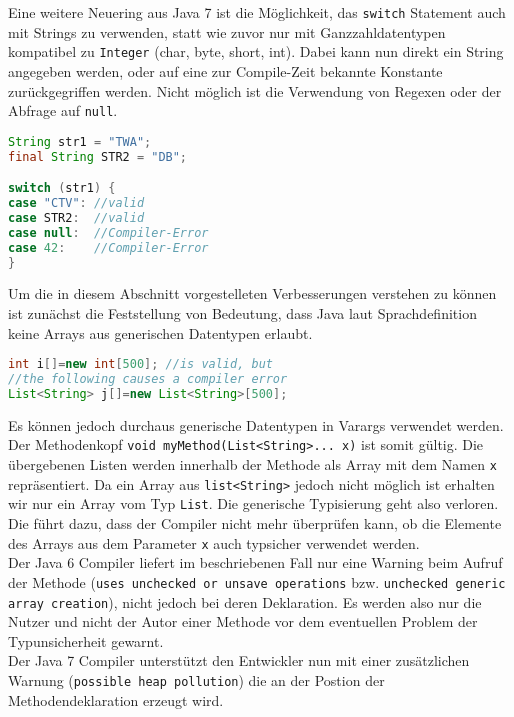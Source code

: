 \documentclass[times, 10pt,twocolumn]{article}
\begin{document}
Eine weitere Neuering aus Java 7 ist die Möglichkeit, das \texttt{switch} Statement auch mit Strings zu verwenden, statt wie
zuvor nur mit Ganzzahldatentypen kompatibel zu \texttt{Integer} (char, byte, short, int). Dabei kann nun direkt ein String
angegeben werden, oder auf eine zur Compile-Zeit bekannte Konstante zurückgegriffen werden. Nicht möglich ist die Verwendung
von Regexen oder der Abfrage auf \texttt{null}.\cite{javainsel2}

\begin{lstlisting}[language=java,breaklines=true]
String str1 = "TWA";
final String STR2 = "DB";

switch (str1) {
case "CTV": //valid
case STR2:  //valid
case null:  //Compiler-Error
case 42:	//Compiler-Error
}
\end{lstlisting}

Um die in diesem Abschnitt vorgestelleten Verbesserungen verstehen zu können ist zunächst die Feststellung von Bedeutung, dass Java laut Sprachdefinition keine Arrays aus generischen Datentypen erlaubt.
\begin{lstlisting}[language=java,breaklines=true]
int i[]=new int[500]; //is valid, but
//the following causes a compiler error
List<String> j[]=new List<String>[500];
\end{lstlisting}
Es können jedoch durchaus generische Datentypen in Varargs verwendet werden. Der Methodenkopf \texttt{void myMethod(List<String>... x)} ist somit gültig. Die übergebenen Listen werden innerhalb der Methode als Array mit dem Namen \texttt{x} repräsentiert. Da ein Array aus \texttt{list<String>} jedoch nicht möglich ist erhalten wir nur ein Array vom Typ \texttt{List}. Die generische Typisierung geht also verloren.\\

Die führt dazu, dass der Compiler nicht mehr überprüfen kann, ob die Elemente des Arrays aus dem Parameter \texttt{x} auch typsicher verwendet werden.\cite{v2bJava7}\\

Der Java 6 Compiler liefert im beschriebenen Fall nur eine Warning beim Aufruf der Methode (\texttt{uses unchecked or unsave operations} bzw. \texttt{unchecked generic array creation}), nicht jedoch bei deren Deklaration. Es werden also nur die Nutzer und nicht der Autor einer Methode vor dem eventuellen Problem der Typunsicherheit gewarnt.\\

Der Java 7 Compiler unterstützt den Entwickler nun mit einer zusätzlichen Warnung (\texttt{possible heap pollution}) die an der Postion der Methodendeklaration erzeugt wird.\\
\end{document}
